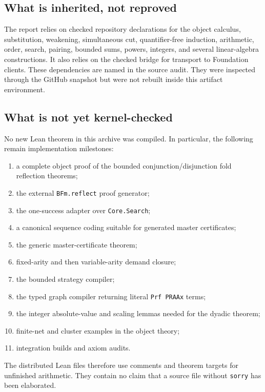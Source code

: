 \subsection{What is inherited, not reproved}

The report relies on checked repository declarations for the object calculus,
substitution, weakening, simultaneous cut, quantifier-free induction,
arithmetic, order, search, pairing, bounded sums, powers, integers, and several
linear-algebra constructions.  It also relies on the checked bridge for
transport to Foundation clients.  These dependencies are named in the source
audit.  They were inspected through the GitHub snapshot but were not rebuilt
inside this artifact environment.

\subsection{What is not yet kernel-checked}

No new Lean theorem in this archive was compiled.  In particular, the
following remain implementation milestones:

\begin{enumerate}
\item a complete object proof of the bounded conjunction/disjunction fold
      reflection theorems;
\item the external \texttt{BFm.reflect} proof generator;
\item the one-success adapter over \texttt{Core.Search};
\item a canonical sequence coding suitable for generated master certificates;
\item the generic master-certificate theorem;
\item fixed-arity and then variable-arity demand closure;
\item the bounded strategy compiler;
\item the typed graph compiler returning literal \texttt{Prf PRAAx} terms;
\item the integer absolute-value and scaling lemmas needed for the dyadic
      theorem;
\item finite-net and cluster examples in the object theory;
\item integration builds and axiom audits.
\end{enumerate}

The distributed Lean files therefore use comments and theorem targets for
unfinished arithmetic.  They contain no claim that a source file without
\texttt{sorry} has been elaborated.

